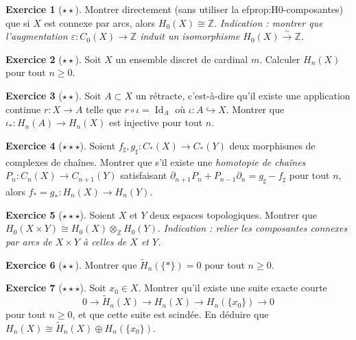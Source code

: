 \documentclass[12pt,a4paper,openany]{book}
\theoremstyle{definition}
\newtheorem{exercice}{Exercice}[chapter]
\theoremstyle{plain}
\theoremstyle{remark}
\newcommand{\Z}{\mathbb{Z}}
\DeclareMathOperator{\Id}{Id}
\begin{document}
\begin{exercice}[$\star\star$]\label{exo:H0-connexe}
Montrer directement (sans utiliser la 
ef{prop:H0-composantes}) que si $X$ est connexe par arcs,
alors $H_0(X) \cong \Z$. \emph{Indication : montrer que l'augmentation $\varepsilon \colon C_0(X) \to \Z$
induit un isomorphisme $H_0(X) \xrightarrow{\sim} \Z$.}
\end{exercice}

\begin{exercice}[$\star\star$]\label{exo:homologie-espace-discret}
Soit $X$ un ensemble discret de cardinal $m$. Calculer $H_n(X)$ pour tout $n \geq 0$.
\end{exercice}

\begin{exercice}[$\star\star$]\label{exo:fonctorialite-retraction}
Soit $A \subset X$ un rétracte, c'est-à-dire qu'il existe une application continue $r \colon X \to A$
telle que $r \circ \iota = \Id_A$ où $\iota \colon A \hookrightarrow X$.
Montrer que $\iota_* \colon H_n(A) \to H_n(X)$ est injective pour tout $n$.
\end{exercice}

\begin{exercice}[$\star\star\star$]\label{exo:homotopie-chaines}
Soient $f_\sharp, g_\sharp \colon C_*(X) \to C_*(Y)$ deux morphismes de complexes de chaînes.
Montrer que s'il existe une \emph{homotopie de chaînes} $P_n \colon C_n(X) \to C_{n+1}(Y)$
satisfaisant $\partial_{n+1} P_n + P_{n-1} \partial_n = g_\sharp - f_\sharp$ pour tout $n$,
alors $f_*= g_* \colon H_n(X) \to H_n(Y)$.
\end{exercice}

\begin{exercice}[$\star\star\star$]\label{exo:homologie-produit}
Soient $X$ et $Y$ deux espaces topologiques. Montrer que
$H_0(X \times Y) \cong H_0(X) \otimes_\Z H_0(Y)$.
\emph{Indication : relier les composantes connexes par arcs de $X \times Y$ à celles de $X$ et $Y$.}
\end{exercice}

\begin{exercice}[$\star\star$]\label{exo:homologie-reduite-point}
Montrer que $\widetilde{H}_n(\{*\}) = 0$ pour tout $n \geq 0$.
\end{exercice}

\begin{exercice}[$\star\star\star$]\label{exo:suite-exacte-augmentation}
Soit $x_0 \in X$. Montrer qu'il existe une suite exacte courte
\[
  0 \longrightarrow \widetilde{H}_n(X) \longrightarrow H_n(X) \longrightarrow H_n(\{x_0\}) \longrightarrow 0
\]
pour tout $n \geq 0$, et que cette suite est scindée. En déduire que $H_n(X) \cong \widetilde{H}_n(X) \oplus H_n(\{x_0\})$.
\end{exercice}
\end{document}
